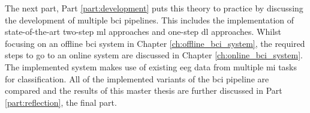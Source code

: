 The next part, Part \ref{part:development} puts this theory to practice by discussing the development of multiple \gls{bci} pipelines.
This includes the implementation of state-of-the-art two-step \gls{ml} approaches and one-step \gls{dl} approaches.
Whilst focusing on an offline \gls{bci} system in Chapter \ref{ch:offline_bci_system}, the required steps to go to an online system are discussed in Chapter \ref{ch:online_bci_system}.
The implemented system makes use of existing \gls{eeg} data from multiple \gls{mi} tasks for classification.
All of the implemented variants of the \gls{bci} pipeline are compared and the results of this master thesis are further discussed in Part \ref{part:reflection}, the final part.